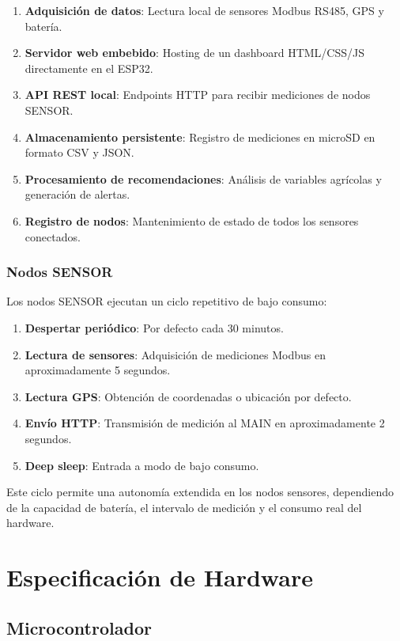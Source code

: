\documentclass[journal]{IEEEtran}
\begin{document}
\begin{enumerate}
\item \textbf{Adquisición de datos}: Lectura local de sensores Modbus RS485, GPS y batería.
\item \textbf{Servidor web embebido}: Hosting de un dashboard HTML/CSS/JS directamente en el ESP32.
\item \textbf{API REST local}: Endpoints HTTP para recibir mediciones de nodos SENSOR.
\item \textbf{Almacenamiento persistente}: Registro de mediciones en microSD en formato CSV y JSON.
\item \textbf{Procesamiento de recomendaciones}: Análisis de variables agrícolas y generación de alertas.
\item \textbf{Registro de nodos}: Mantenimiento de estado de todos los sensores conectados.
\end{enumerate}

\subsubsection{Nodos SENSOR}

Los nodos SENSOR ejecutan un ciclo repetitivo de bajo consumo:

\begin{enumerate}
\item \textbf{Despertar periódico}: Por defecto cada 30 minutos.
\item \textbf{Lectura de sensores}: Adquisición de mediciones Modbus en aproximadamente 5 segundos.
\item \textbf{Lectura GPS}: Obtención de coordenadas o ubicación por defecto.
\item \textbf{Envío HTTP}: Transmisión de medición al MAIN en aproximadamente 2 segundos.
\item \textbf{Deep sleep}: Entrada a modo de bajo consumo.
\end{enumerate}

Este ciclo permite una autonomía extendida en los nodos sensores, dependiendo de la capacidad de batería, el intervalo de medición y el consumo real del hardware.

\section{Especificación de Hardware}

\subsection{Microcontrolador}
\end{document}
